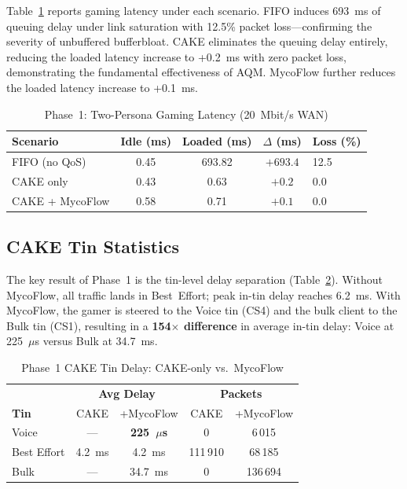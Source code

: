 Table~\ref{tab:phase1} reports gaming latency under each scenario. FIFO induces 693~ms of queuing delay under link saturation with 12.5\% packet loss---confirming the severity of unbuffered bufferbloat. CAKE eliminates the queuing delay entirely, reducing the loaded latency increase to +0.2~ms with zero packet loss, demonstrating the fundamental effectiveness of AQM. MycoFlow further reduces the loaded latency increase to +0.1~ms.

\begin{table}[h]
\caption{Phase~1: Two-Persona Gaming Latency (20~Mbit/s WAN)}
\label{tab:phase1}
\centering
\small
\begin{tabular}{lcccl}
\toprule
\textbf{Scenario} & \textbf{Idle (ms)} & \textbf{Loaded (ms)} & \textbf{$\Delta$ (ms)} & \textbf{Loss (\%)} \\
\midrule
FIFO (no QoS)     & 0.45 & 693.82 & $+693.4$ & 12.5 \\
CAKE only         & 0.43 &   0.63 & $+0.2$   & 0.0  \\
CAKE + MycoFlow   & 0.58 &   0.71 & $+0.1$   & 0.0  \\
\bottomrule
\end{tabular}
\end{table}

\subsection{CAKE Tin Statistics}

The key result of Phase~1 is the tin-level delay separation (Table~\ref{tab:tins1}). Without MycoFlow, all traffic lands in Best~Effort; peak in-tin delay reaches 6.2~ms. With MycoFlow, the gamer is steered to the Voice tin (CS4) and the bulk client to the Bulk tin (CS1), resulting in a \textbf{154$\times$ difference} in average in-tin delay: Voice at 225~$\mu$s versus Bulk at 34.7~ms.

\begin{table}[h]
\caption{Phase~1 CAKE Tin Delay: CAKE-only vs.\ MycoFlow}
\label{tab:tins1}
\centering
\small
\begin{tabular}{lcccc}
\toprule
 & \multicolumn{2}{c}{\textbf{Avg Delay}} & \multicolumn{2}{c}{\textbf{Packets}} \\
\textbf{Tin} & CAKE & +MycoFlow & CAKE & +MycoFlow \\
\midrule
Voice       & ---    & \textbf{225~$\mu$s} & 0        & 6\,015 \\
Best Effort & 4.2~ms & 4.2~ms              & 111\,910 & 68\,185 \\
Bulk        & ---    & 34.7~ms             & 0        & 136\,694 \\
\bottomrule
\end{tabular}
\end{table}

